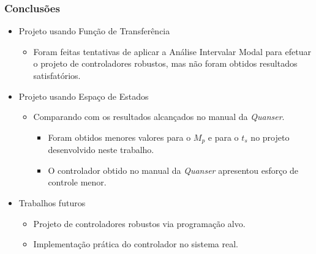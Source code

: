 \documentclass{beamer}
\begin{document}
\begin{frame}
\frametitle{Conclusões}
\begin{itemize}
\item Projeto usando Função de Transferência
\begin{itemize}
\item Foram feitas tentativas de aplicar a Análise Intervalar Modal para efetuar o projeto de controladores robustos, mas não foram obtidos resultados satisfatórios.
\end{itemize}

\item Projeto usando Espaço de Estados
\begin{itemize}
\item Comparando com os resultados alcançados no manual da \textit{Quanser}.
\begin{itemize}
\item Foram obtidos menores valores para o $M_p$ e para o $t_s$ no projeto desenvolvido neste trabalho.
\item O controlador obtido no manual da \textit{Quanser} apresentou esforço de controle menor.
\end{itemize}
\end{itemize}

\item Trabalhos  futuros
\begin{itemize}
\item Projeto de controladores robustos via programação alvo.
\item Implementação prática do controlador no sistema real.
\end{itemize}
\end{itemize}
\end{frame}
\end{document}
